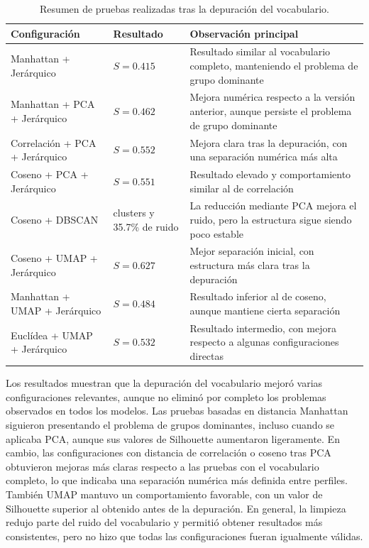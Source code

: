 \documentclass[11pt,spanish,listoffigures,listoftables]{tfgetsinf}
\begin{document}
\begin{table}[H]
\centering
\small
\renewcommand{\arraystretch}{1.25}
\begin{tabular}{
>{\centering\arraybackslash}m{}
>{\centering\arraybackslash}m{}
m{}
}
\hline
\textbf{Configuración} & \textbf{Resultado} & \textbf{Observación principal} \\
\hline
Manhattan + Jerárquico & \(S=0.415\) & Resultado similar al vocabulario completo, manteniendo el problema de grupo dominante \\
\hline
Manhattan + PCA + Jerárquico & \(S=0.462\) & Mejora numérica respecto a la versión anterior, aunque persiste el problema de grupo dominante \\
\hline
Correlación + PCA + Jerárquico & \(S=0.552\) & Mejora clara tras la depuración, con una separación numérica más alta \\
\hline
Coseno + PCA + Jerárquico & \(S=0.551\) & Resultado elevado y comportamiento similar al de correlación \\
\hline
Coseno + DBSCAN & 2 clusters y 35.7\% de ruido & La reducción mediante PCA mejora el ruido, pero la estructura sigue siendo poco estable \\
\hline
Coseno + UMAP + Jerárquico & \(S=0.627\) & Mejor separación inicial, con estructura más clara tras la depuración \\
\hline
Manhattan + UMAP + Jerárquico & \(S=0.484\) & Resultado inferior al de coseno, aunque mantiene cierta separación \\
\hline
Euclídea + UMAP + Jerárquico & \(S=0.532\) & Resultado intermedio, con mejora respecto a algunas configuraciones directas \\
\hline
\end{tabular}
\caption{Resumen de pruebas realizadas tras la depuración del vocabulario.}
\label{tab:pruebas_embeddings_sin_localizacion}
\end{table}

Los resultados muestran que la depuración del vocabulario mejoró varias configuraciones relevantes, aunque no eliminó por completo los problemas observados en todos los modelos. Las pruebas basadas en distancia Manhattan siguieron presentando el problema de grupos dominantes, incluso cuando se aplicaba PCA, aunque sus valores de Silhouette aumentaron ligeramente. En cambio, las configuraciones con distancia de correlación o coseno tras PCA obtuvieron mejoras más claras respecto a las pruebas con el vocabulario completo, lo que indicaba una separación numérica más definida entre perfiles. También UMAP mantuvo un comportamiento favorable, con un valor de Silhouette superior al obtenido antes de la depuración. En general, la limpieza redujo parte del ruido del vocabulario y permitió obtener resultados más consistentes, pero no hizo que todas las configuraciones fueran igualmente válidas.
\end{document}
